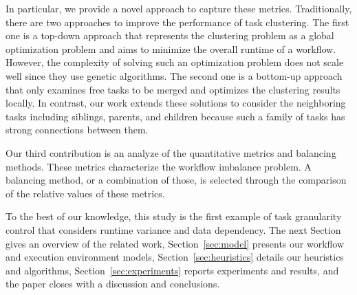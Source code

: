 \documentclass[final]{IEEEtran}
\begin{document}
In particular, we provide a novel approach to capture these metrics. Traditionally, there are two approaches to improve the performance of task clustering. The first one is a top-down approach \cite{6217508} that represents the clustering problem as a global optimization problem and aims to minimize the overall runtime of a workflow. However, the complexity of solving such an optimization problem does not scale well since they use genetic algorithms. The second one is a bottom-up approach~\cite{Muthuvelu:2005:DJG:1082290.1082297,4958835} that only examines free tasks to be merged and optimizes the clustering results locally. In contrast, our work extends these solutions to consider the neighboring tasks including siblings, parents, and children because such a family of tasks has strong connections between them. 

Our third contribution is an analyze of the quantitative metrics and balancing methods. These metrics characterize the workflow imbalance problem. A balancing method, or a combination of those, is selected through the comparison of the relative values of these metrics.


%

To the best of our knowledge, this study is the first example of task granularity control that considers runtime variance and data dependency. The next Section gives an overview of the related work, Section~\ref{sec:model} presents our workflow and execution environment models, Section~\ref{sec:heuristics} details our heuristics and algorithms, Section~\ref{sec:experiments} reports experiments and results, and the paper closes with a discussion and conclusions.
\end{document}

